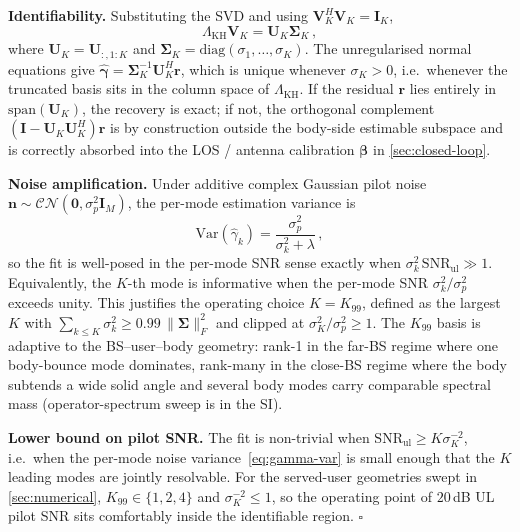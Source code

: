 \documentclass[journal,twocolumn,10pt]{IEEEtran}
\theoremstyle{plain}
\theoremstyle{definition}
\theoremstyle{remark}
\newcommand{\betab}{\bm{\beta}}
\newcommand{\gammab}{\bm{\gamma}}
\begin{document}
\textbf{Identifiability.} Substituting the SVD and using
$\bm{V}_K^{\!H}\bm{V}_K = \bm{I}_K$,
\begin{equation}\label{eq:Fb-Vk}
  \Lambda_{\mathrm{KH}}\bm{V}_K = \bm{U}_K\bm{\Sigma}_K\,,
\end{equation}
where $\bm{U}_K = \bm{U}_{:,1:K}$ and
$\bm{\Sigma}_K = \mathrm{diag}(\sigma_1,\dots,\sigma_K)$. The
unregularised normal equations give
$\hat{\gammab} = \bm{\Sigma}_K^{-1}\bm{U}_K^{\!H}\bm{r}$, which is
unique whenever $\sigma_K > 0$, i.e.~whenever the truncated basis
sits in the column space of $\Lambda_{\mathrm{KH}}$. If the residual
$\bm{r}$ lies entirely in $\mathrm{span}(\bm{U}_K)$, the recovery is
exact; if not, the orthogonal complement
$(\bm{I}-\bm{U}_K\bm{U}_K^{\!H})\bm{r}$ is by construction outside
the body-side estimable subspace and is correctly absorbed into the
LOS / antenna calibration $\betab$ in
\cref{sec:closed-loop}.

\textbf{Noise amplification.} Under additive complex Gaussian pilot
noise $\bm{n} \sim \mathcal{CN}(\bm{0},\sigma_p^2 \bm{I}_M)$,
the per-mode estimation variance is
\begin{equation}\label{eq:gamma-var}
  \mathrm{Var}(\hat\gamma_k)
    = \frac{\sigma_p^2}{\sigma_k^2 + \lambda}\,,
\end{equation}
so the fit is well-posed in the per-mode SNR
sense exactly when $\sigma_k^2 \,\mathrm{SNR}_{\mathrm{ul}}\gg 1$.
Equivalently, the $K$-th mode is informative when the per-mode SNR
$\sigma_k^2/\sigma_p^2$ exceeds unity. This justifies the operating
choice $K = K_{99}$, defined as the largest $K$ with
$\sum_{k\leq K}\sigma_k^2 \geq 0.99\,\|\bm{\Sigma}\|_F^2$ and
clipped at $\sigma_K^2 / \sigma_p^2 \geq 1$. The $K_{99}$ basis is
adaptive to the BS--user--body geometry: rank-1 in the far-BS regime
where one body-bounce mode dominates, rank-many in the close-BS
regime where the body subtends a wide solid angle and several body
modes carry comparable spectral mass (operator-spectrum sweep is in
the SI).

\textbf{Lower bound on pilot SNR.} The fit is non-trivial when
$\mathrm{SNR}_{\mathrm{ul}} \geq K\sigma_K^{-2}$, i.e.~when the
per-mode noise variance~\eqref{eq:gamma-var} is small enough that
the $K$ leading modes are jointly resolvable. For the served-user
geometries swept in \cref{sec:numerical}, $K_{99} \in \{1, 2, 4\}$
and $\sigma_K^{-2} \leq 1$, so the operating point of
$20\,$dB UL pilot SNR sits comfortably inside the identifiable
region. \hfill$\square$
\end{document}
